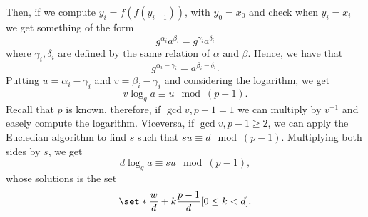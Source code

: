 \documentclass{subfiles}
\begin{document}
        Then, if we compute \(y_{i} = f(f(y_{i - 1}))\), with \(y_{0} = x_{0}\)
            and check when \(y_{i} = x_{i}\) we get something of the form 
            \[
                g^{\alpha_{i}}a^{\beta_{i}} = g^{\gamma_{i}}a^{\delta_{i}}
            \]
            where \(\gamma_{i}, \delta_{i}\) are defined by the same relation of 
            \(\alpha \text{ and } \beta\).
            Hence, we have that 
            \[
                g^{\alpha_{i} - \gamma_{i}} = a^{\beta_{i} - \delta_{i}}.
            \]
            Putting \(u = \alpha_{i} - \gamma_{i}\) and \(v = \beta_{i} - \gamma_{i}\)
            and considering the logarithm, we get 
            \[
                v \log_{g} a \equiv u \mod{(p - 1)}.
            \]
            Recall that \(p\) is known, therefore, if \(\gcd{v, p - 1} = 1\)
            we can multiply by \(v^{-1}\) and easely compute the logarithm.
            Viceversa, if \(\gcd{v, p - 1} \ge 2\), we can apply the Eucledian algorithm
            to find \(s\) such that \(su \equiv d \mod{(p - 1)}\). Multiplying 
            both sides by \(s\), we get 
            \[
                d \log_{g}{a} \equiv su \mod{(p - 1)},
            \]
            whose solutions is the set 
            \[
                \set*{\frac{w}{d} + k \frac{p - 1}{d}}[0 \le k < d].
            \]
\end{document}
